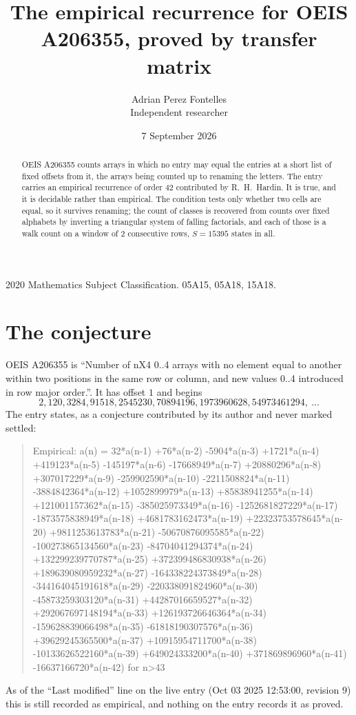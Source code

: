 \documentclass[11pt,a4paper]{article}
\title{The empirical recurrence for OEIS A206355, proved by transfer matrix}
\author{Adrian Perez Fontelles\\ \small Independent researcher}
\date{7 September 2026}
\theoremstyle{plain}
\theoremstyle{definition}
\begin{document}
\maketitle

\begin{abstract}
OEIS A206355 counts arrays in which no entry may equal the entries at a short list of fixed offsets
from it, the arrays being counted up to renaming the letters. The entry carries an empirical
recurrence of order $42$ contributed by R.~H.~Hardin. It is true, and it is decidable
rather than empirical. The condition tests only whether two cells are equal, so it survives
renaming; the count of classes is recovered from counts over fixed alphabets by inverting a
triangular system of falling factorials, and each of those is a walk count on a window of
$2$ consecutive rows, $S=15395$ states in all.
\end{abstract}

\noindent\small 2020 Mathematics Subject Classification. 05A15, 05A18, 15A18.\normalsize

\section{The conjecture}

OEIS A206355 is ``Number of nX4 0..4 arrays with no element equal to another within two positions in the same row or column, and new values 0..4 introduced in row major order.''. It has offset $1$ and begins
\[
2, 120, 3284, 91518, 2545230, 70894196, 1973960628, 54973461294,\ \dots
\]
The entry states, as a conjecture contributed by its author and never marked settled:
\begin{quote}
Empirical: a(n) = 32*a(n-1) +76*a(n-2) -5904*a(n-3) +1721*a(n-4) +419123*a(n-5) -145197*a(n-6) -17668949*a(n-7) +20880296*a(n-8) +307017229*a(n-9) -259902590*a(n-10) -2211508824*a(n-11) -3884842364*a(n-12) +1052899979*a(n-13) +85838941255*a(n-14) +121001157362*a(n-15) -385025973349*a(n-16) -1252681827229*a(n-17) -1873575838949*a(n-18) +4681783162473*a(n-19) +22323753578645*a(n-20) +9811253613783*a(n-21) -50670876095585*a(n-22) -100273865134560*a(n-23) -84704041294374*a(n-24) +132299239770787*a(n-25) +372399486830938*a(n-26) +189639080959232*a(n-27) -164338224373849*a(n-28) -344164045191618*a(n-29) -220338091824960*a(n-30) -45873259303120*a(n-31) +44287016659527*a(n-32) +292067697148194*a(n-33) +126193726646364*a(n-34) -159628839066498*a(n-35) -61818190307576*a(n-36) +39629245365500*a(n-37) +10915954711700*a(n-38) -10133626522160*a(n-39) +649024333200*a(n-40) +371869896960*a(n-41) -16637166720*a(n-42) for n>43
\end{quote}
As of the ``Last modified'' line on the live entry (Oct 03 2025 12:53:00, revision 9) this is still
recorded as empirical, and nothing on the entry records it as proved.
\end{document}
